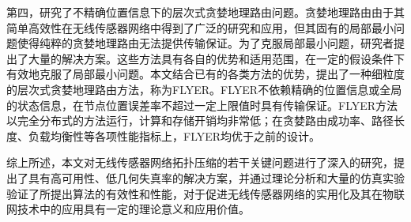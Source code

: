 \begin{cabstract}
第四，研究了不精确位置信息下的层次式贪婪地理路由问题。贪婪地理路由由于其简单高效性在无线传感器网络中得到了广泛的研究和应用，但其固有的局部最小问题使得纯粹的贪婪地理路由无法提供传输保证。为了克服局部最小问题，研究者提出了大量的解决方案。这些方法具有各自的优势和适用范围，在一定的假设条件下有效地克服了局部最小问题。本文结合已有的各类方法的优势，提出了一种细粒度的层次式贪婪地理路由方法，称为FLYER。FLYER不依赖精确的位置信息或全局的状态信息，在节点位置误差率不超过一定上限值时具有传输保证。FLYER方法以完全分布式的方法运行，计算和存储开销均非常低；在贪婪路由成功率、路径长度、负载均衡性等各项性能指标上，FLYER均优于之前的设计。

综上所述，本文对无线传感器网络拓扑压缩的若干关键问题进行了深入的研究，提出了具有高可用性、低几何失真率的解决方案，并通过理论分析和大量的仿真实验验证了所提出算法的有效性和性能，对于促进无线传感器网络的实用化及其在物联网技术中的应用具有一定的理论意义和应用价值。
\end{cabstract}

